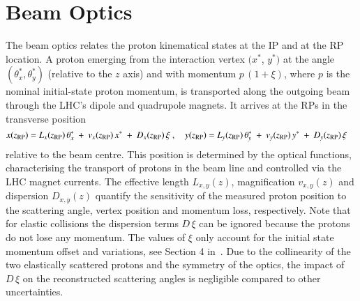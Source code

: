 \section{Beam Optics}
\label{sec:beam optics}
%
The beam optics relates the proton kinematical states at the IP and at the RP location. A proton emerging from the interaction vertex $(x^*$, $y^*)$ at the angle $(\theta_x^*,\theta_y^*)$ (relative to the $z$ axis) and with momentum $p\,(1+\xi)$, where $p$ is the nominal initial-state proton momentum, is transported along the outgoing beam through the LHC's dipole and quadrupole magnets. It arrives at the RPs in the transverse position
\begin{equation}
\label{eq:prot trans}
x(z_{\rm RP}) = L_x(z_{\rm RP})\, \theta_x^*\ +\ v_x(z_{\rm RP})\, x^*\ +\ D_x(z_{\rm RP})\, \xi\ ,\quad y(z_{\rm RP}) = L_y(z_{\rm RP})\, \theta_y^*\ +\ v_y(z_{\rm RP})\, y^*\ +\ D_y(z_{\rm RP})\, \xi \quad
\end{equation}
relative to the beam centre. This position is determined by the optical functions, characterising the transport of protons in the beam line and controlled via 
the LHC magnet currents.
The effective length $L_{x,y}(z)$, magnification $v_{x,y}(z)$ and dispersion $D_{x,y}(z)$ quantify the sensitivity of the measured proton position to the 
scattering angle, vertex position and momentum loss, respectively.
Note that for elastic collisions the dispersion terms $D\,\xi$ can be ignored because the protons do not lose any momentum. The values of $\xi$ only account for the initial state momentum offset and variations, see Section 4 in~\cite{8tev-90m}. Due to the collinearity of the two elastically scattered protons and the symmetry of the optics, the impact of $D\,\xi$ on the reconstructed scattering angles is negligible compared to other uncertainties.

